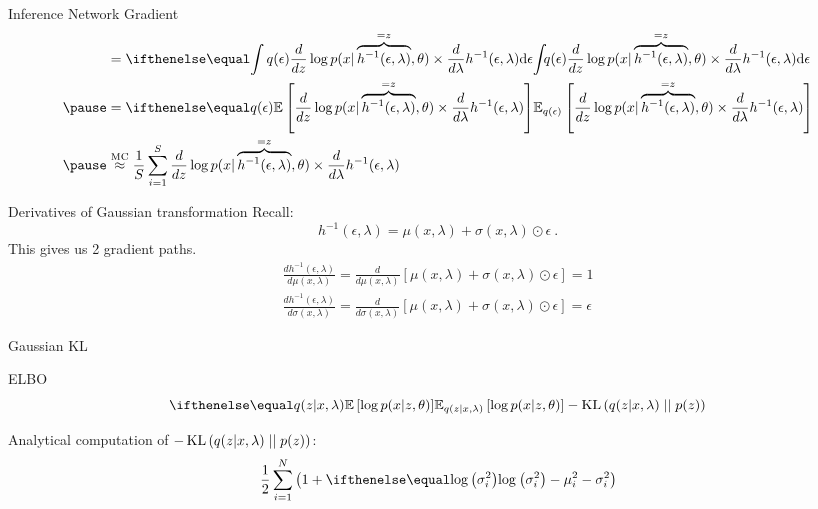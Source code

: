 \documentclass[14pt]{beamer}
\begin{document}
\begin{frame}{Inference Network Gradient}
\begin{equation*}
\begin{aligned}
&= \intl{q(\epsilon) \frac{d}{dz} \log p(x| \overbrace{h^{-1}(\epsilon, \lambda)}^{=z}, \theta) \times \frac{d}{d\lambda} h^{-1}(\epsilon, \lambda)}{\epsilon}  \\ \pause
&= \E[q(\epsilon)]{\frac{d}{dz} \log p(x| \overbrace{h^{-1}(\epsilon, \lambda)}^{=z}, \theta)\times \frac{d}{d\lambda} h^{-1}(\epsilon, \lambda)}\\ \pause
&\overset{\text{MC}}{\approx} \frac{1}{S}\sum_{i=1}^{S} \frac{d}{dz} \log p(x| \overbrace{h^{-1}(\epsilon, \lambda)}^{=z}, \theta) \times \frac{d}{d\lambda} h^{-1}(\epsilon, \lambda)
\end{aligned}
\end{equation*}
\end{frame}

\begin{frame}{Derivatives of Gaussian transformation}
Recall:
$$ h^{-1}(\epsilon, \lambda) = \mu(x,\lambda) + \sigma(x,\lambda) \odot \epsilon \ . $$
\pause
This gives us 2 gradient paths.
\pause
\begin{align*}
\frac{d h^{-1}(\epsilon, \lambda)}{d\mu(x,\lambda)} = \frac{d}{d\mu(x,\lambda)}\left[ \mu(x,\lambda) + \sigma(x,\lambda) \odot \epsilon \right] = 1 \\
\frac{d h^{-1}(\epsilon, \lambda)}{d\sigma(x,\lambda)} = \frac{d}{d\sigma(x,\lambda)}\left[ \mu(x,\lambda) + \sigma(x,\lambda) \odot \epsilon \right] = \epsilon
\end{align*}
\end{frame}

\begin{frame}{Gaussian KL}
\begin{block}{ELBO}
\begin{equation*}
\E[q(z|x,\lambda)]{\log p(x|z,\theta)} - \KL{q(z|x,\lambda)}{p(z)}
\end{equation*}
\end{block}
\pause
Analytical computation of $ -\operatorname{KL}\left(q(z|x,\lambda)\mid\mid p(z)\right) $:
\begin{equation*}
\frac{1}{2}\sum_{i=1}^{N}\left(1 + \loga{\sigma^{2}_{i}} -
\mu^{2}_{i} - \sigma^{2}_{i} \right)
\end{equation*}
\end{frame}
\end{document}
